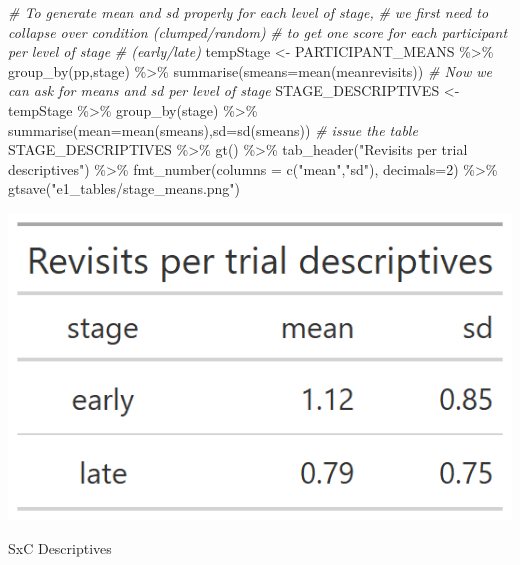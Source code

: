 \documentclass[
]{book}
\newenvironment{Shaded}{\begin{snugshade}}{\end{snugshade}}
\newcommand{\AttributeTok}[1]{\textcolor[rgb]{0.77,0.63,0.00}{#1}}
\newcommand{\CommentTok}[1]{\textcolor[rgb]{0.56,0.35,0.01}{\textit{#1}}}
\newcommand{\DecValTok}[1]{\textcolor[rgb]{0.00,0.00,0.81}{#1}}
\newcommand{\FunctionTok}[1]{\textcolor[rgb]{0.00,0.00,0.00}{#1}}
\newcommand{\NormalTok}[1]{#1}
\newcommand{\OtherTok}[1]{\textcolor[rgb]{0.56,0.35,0.01}{#1}}
\newcommand{\SpecialCharTok}[1]{\textcolor[rgb]{0.00,0.00,0.00}{#1}}
\newcommand{\StringTok}[1]{\textcolor[rgb]{0.31,0.60,0.02}{#1}}
\begin{document}
\begin{Shaded}
\begin{Highlighting}[]
\CommentTok{\# To generate mean and sd properly for each level of stage,}
\CommentTok{\# we first need to collapse over condition (clumped/random)}
\CommentTok{\# to get one score for each participant per level of stage}
\CommentTok{\# (early/late)}
\NormalTok{tempStage }\OtherTok{\textless{}{-}}\NormalTok{ PARTICIPANT\_MEANS }\SpecialCharTok{\%\textgreater{}\%} 
  \FunctionTok{group\_by}\NormalTok{(pp,stage) }\SpecialCharTok{\%\textgreater{}\%} 
  \FunctionTok{summarise}\NormalTok{(}\AttributeTok{smeans=}\FunctionTok{mean}\NormalTok{(meanrevisits))}
\CommentTok{\# Now we can ask for means and sd per level of stage}
\NormalTok{STAGE\_DESCRIPTIVES }\OtherTok{\textless{}{-}}\NormalTok{ tempStage  }\SpecialCharTok{\%\textgreater{}\%} 
  \FunctionTok{group\_by}\NormalTok{(stage) }\SpecialCharTok{\%\textgreater{}\%} 
  \FunctionTok{summarise}\NormalTok{(}\AttributeTok{mean=}\FunctionTok{mean}\NormalTok{(smeans),}\AttributeTok{sd=}\FunctionTok{sd}\NormalTok{(smeans))}
\CommentTok{\# issue the table}
\NormalTok{STAGE\_DESCRIPTIVES }\SpecialCharTok{\%\textgreater{}\%} 
  \FunctionTok{gt}\NormalTok{() }\SpecialCharTok{\%\textgreater{}\%} 
  \FunctionTok{tab\_header}\NormalTok{(}\StringTok{"Revisits per trial descriptives"}\NormalTok{) }\SpecialCharTok{\%\textgreater{}\%} 
  \FunctionTok{fmt\_number}\NormalTok{(}\AttributeTok{columns =} \FunctionTok{c}\NormalTok{(}\StringTok{"mean"}\NormalTok{,}\StringTok{"sd"}\NormalTok{), }\AttributeTok{decimals=}\DecValTok{2}\NormalTok{) }\SpecialCharTok{\%\textgreater{}\%} 
  \FunctionTok{gtsave}\NormalTok{(}\StringTok{"e1\_tables/stage\_means.png"}\NormalTok{)}
\end{Highlighting}
\end{Shaded}

\includegraphics[width=0.33\linewidth]{e1_figures/STAGE_DESCRIPTIVES-1}

SxC Descriptives
\end{document}
